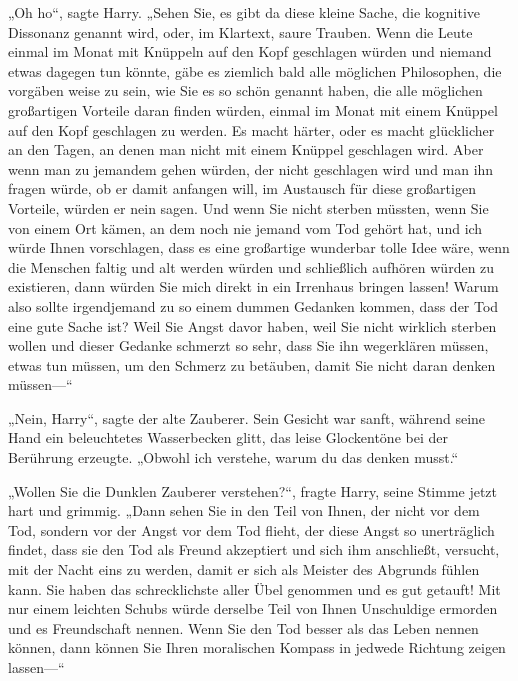 „Oh ho“, sagte Harry. „Sehen Sie, es gibt da diese kleine Sache, die kognitive Dissonanz genannt wird, oder, im Klartext, saure Trauben. Wenn die Leute einmal im Monat mit Knüppeln auf den Kopf geschlagen würden und niemand etwas dagegen tun könnte, gäbe es ziemlich bald alle möglichen Philosophen, die vorgäben weise zu sein, wie Sie es so schön genannt haben, die alle möglichen großartigen Vorteile daran finden würden, einmal im Monat mit einem Knüppel auf den Kopf geschlagen zu werden. Es macht härter, oder es macht glücklicher an den Tagen, an denen man nicht mit einem Knüppel geschlagen wird. Aber wenn man zu jemandem gehen würden, der nicht geschlagen wird und man ihn fragen würde, ob er damit anfangen will, im Austausch für diese großartigen Vorteile, würden er nein sagen. Und wenn Sie nicht sterben müssten, wenn Sie von einem Ort kämen, an dem noch nie jemand vom Tod gehört hat, und ich würde Ihnen vorschlagen, dass es eine großartige wunderbar tolle Idee wäre, wenn die Menschen faltig und alt werden würden und schließlich aufhören würden zu existieren, dann würden Sie mich direkt in ein Irrenhaus bringen lassen! Warum also sollte irgendjemand zu so einem dummen Gedanken kommen, dass der Tod eine gute Sache ist? Weil Sie Angst davor haben, weil Sie nicht wirklich sterben wollen und dieser Gedanke schmerzt so sehr, dass Sie ihn wegerklären müssen, etwas tun müssen, um den Schmerz zu betäuben, damit Sie nicht daran denken müssen—“

„Nein, Harry“, sagte der alte Zauberer. Sein Gesicht war sanft, während seine Hand ein beleuchtetes Wasserbecken glitt, das leise Glockentöne bei der Berührung erzeugte. „Obwohl ich verstehe, warum du das denken musst.“

„Wollen Sie die Dunklen Zauberer verstehen?“, fragte Harry, seine Stimme jetzt hart und grimmig. „Dann sehen Sie in den Teil von Ihnen, der nicht vor dem Tod, sondern vor der Angst vor dem Tod flieht, der diese Angst so unerträglich findet, dass sie den Tod als Freund akzeptiert und sich ihm anschließt, versucht, mit der Nacht eins zu werden, damit er sich als Meister des Abgrunds fühlen kann. Sie haben das schrecklichste aller Übel genommen und es gut getauft! Mit nur einem leichten Schubs würde derselbe Teil von Ihnen Unschuldige ermorden und es Freundschaft nennen. Wenn Sie den Tod besser als das Leben nennen können, dann können Sie Ihren moralischen Kompass in jedwede Richtung zeigen lassen—“

